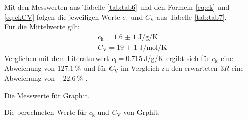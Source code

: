 Mit den Messwerten aus Tabelle \ref{tab:tab6} und den Formeln \eqref{eq:ck} und \eqref{eq:ckCV} folgen die jeweiligen Werte $c_\text{k}$ und $C_\text{V}$ aus Tabelle \ref{tab:tab7}.\\

Für die Mittelwerte gilt:
\begin{align*}
	c_\text{k} = \SI{1,6(1)}{\joule\per\gram\per\kelvin} \\
	C_\text{V} = \SI{19(1)}{\joule\per\mol\per\kelvin}
\end{align*}
Verglichen mit dem Literaturwert $c_\text{l}=\SI{0,715}{\joule\per\gram\per\kelvin}$ \cite{clit} ergibt sich für $c_\text{k}$ eine Abweichung von $\SI{127,1}{\percent}$ und für $C_\text{V}$ im Vergleich zu den erwarteten $3R$ eine Abweichung von $\SI{-22,6}{\percent}$ .

\begin{table}
	\centering
	\caption{Die Messwerte für Graphit.}
	
	\label{tab:tab6}
\end{table}

\begin{table}
	\centering
	\caption{Die berechneten Werte für $c_\text{k}$ und $C_\text{V}$ von Grphit.}
	
	\label{tab:tab7}
\end{table}



